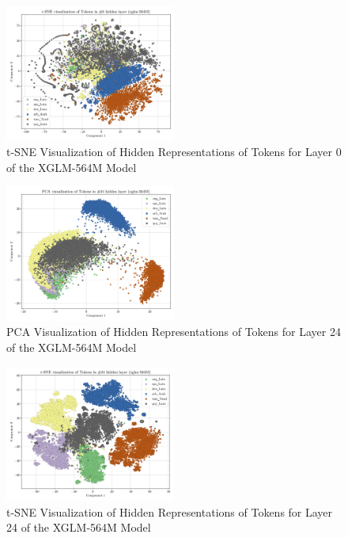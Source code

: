 \documentclass[11pt]{article}
\begin{document}
\begin{figure}[h]
    \centering
    \includegraphics[width=0.5\textwidth]{plots/token_xglm-564M_layer_0_t-SNE.png}
    \caption{t-SNE Visualization of Hidden Representations of Tokens for Layer 0 of the XGLM-564M Model}
\end{figure}

\begin{figure}[h]
    \centering
    \includegraphics[width=0.5\textwidth]{plots/token_xglm-564M_layer_24_PCA.png}
    \caption{PCA Visualization of Hidden Representations of Tokens for Layer 24 of the XGLM-564M Model}
\end{figure}

\begin{figure}[h]
    \centering
    \includegraphics[width=0.5\textwidth]{plots/token_xglm-564M_layer_24_t-SNE.png}
    \caption{t-SNE Visualization of Hidden Representations of Tokens for Layer 24 of the XGLM-564M Model}
\end{figure}
\end{document}
